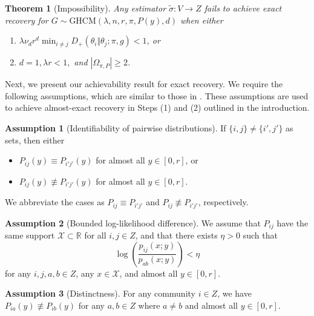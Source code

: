 \documentclass{article}
\newcommand{\R}{\mathbb{R}}
\newcommand{\1}{\mathbbm{1}}
\newcommand{\calX}{\mathcal{X}}
\theoremstyle{definition}
\newtheorem{assumption}{Assumption}
\theoremstyle{plain}
\newtheorem{theorem}{Theorem}
\begin{document}
\begin{theorem}[Impossibility]
\label{thm:impossibility}
    Any estimator $\tilde{\sigma}: V \to Z$ fails to achieve exact recovery for $G \sim \text{GHCM}(\lambda, n, r, \pi, P(y), d)$ when either
    \begin{enumerate}
        \item $\lambda \nu_d r^d \min_{i \neq j} D_+(\theta_i\Vert \theta_j ; \pi ,g) < 1$, or
        \item $d = 1, \lambda r < 1,$ and $|\Omega_{\pi, P}| \geq 2$.
    \end{enumerate}
\end{theorem}

Next, we present our achievability result for exact recovery. We require the following assumptions, which are similar to those in \cite{Gaudio+2025}. These assumptions are used to achieve almost-exact recovery in Steps (1) and (2) outlined in the introduction.
\begin{assumption}[Identifiability of pairwise distributions]
\label{assump:regularity_condition}
    If $\{i, j\} \neq \{i', j'\}$ as sets, then either
    \begin{itemize}
        \item $P_{ij}(y) \equiv P_{i'j'}(y)$ for almost all $y \in [0, r]$, or
        \item $P_{ij}(y) \not \equiv P_{i'j'}(y)$ for almost all $y \in [0, r]$. 
    \end{itemize}
    We abbreviate the cases as $P_{ij} \equiv P_{i'j'}$ and $P_{ij} \not \equiv P_{i'j'}$, respectively.
\end{assumption}

\begin{assumption}[Bounded log-likelihood difference]
\label{assump:bounded_log_likelihood}
We assume that $P_{ij}$ have the same support $\calX \subset \R$ for all $i, j \in Z$, and that there exists $\eta > 0$ such that 
\begin{equation*}
    \log\left( \frac{p_{ij}(x; y)}{p_{ab}(x; y)} \right) < \eta
\end{equation*}
for any $i, j, a, b \in Z$, any $x \in \calX$,  
and almost all $y \in [0, r]$.
\end{assumption}

\begin{assumption}[Distinctness]
\label{assump:distinctness}
For any community $i \in Z$, we have $P_{ia}(y) \not \equiv P_{ib}(y)$ for any $a, b \in Z$ where $a \neq b$ and almost all $y \in [0, r]$.
\end{assumption}
\end{document}
